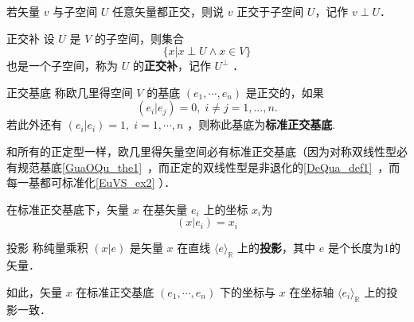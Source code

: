 若矢量 $v$ 与子空间 $U$ 任意矢量都正交，则说 $v$ 正交于子空间 $U$，记作 $v\perp U$．
\begin{definition}{正交补}
设 $U$ 是 $V$ 的子空间，则集合
\begin{equation}
\{ x| x\perp U\wedge x\in V\}
\end{equation}
也是一个子空间，称为 $U$ 的\textbf{正交补}，记作 $U^{\perp}$ ．
\end{definition}
\begin{definition}{正交基底}
称欧几里得空间 $V$ 的基底 $(e_1,\cdots,e_n)$ 是正交的，如果
\begin{equation}
( e_i| e_j)=0,\;i\neq j=1,\dots,n.
\end{equation}
若此外还有 $( e_i| e_i)=1,\;i=1,\cdots ,n$ ，则称此基底为\textbf{标准正交基底}.
\end{definition}

和所有的正定型一样，欧几里得矢量空间必有标准正交基底（因为对称双线性型必有规范基底\autoref{GuaOQu_the1}~，而正定的双线性型是非退化的\autoref{DeQua_def1}~，而每一基都可标准化\autoref{EuVS_ex2} ）．
\begin{exercise}{}
在标准正交基底下，矢量 $x$ 在基矢量 $e_i$ 上的坐标 $x_i$为
\begin{equation}
( x| e_i)=x_i
\end{equation}
\end{exercise}
\begin{definition}{投影}
称纯量乘积 $( x| e)$ 是矢量 $x$ 在直线 $\langle e\rangle_{\mathbb R}$ 上的\textbf{投影}，其中 $ e$ 是个长度为1的矢量．  
\end{definition}
如此，矢量 $ x$ 在标准正交基底 $( e_1,\cdots, e_n)$ 下的坐标与 $x$ 在坐标轴 $\langle e_i\rangle_\mathbb{R}$ 上的投影一致． 